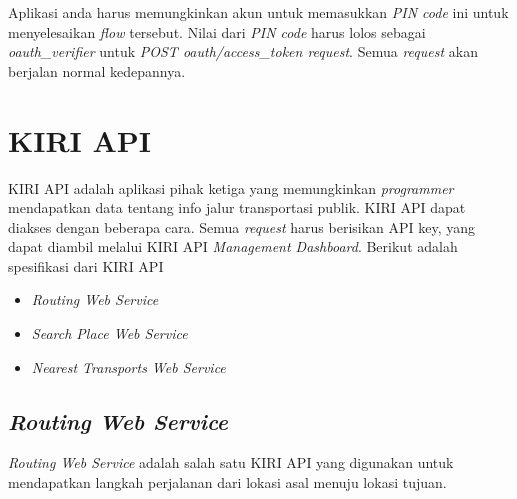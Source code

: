Aplikasi anda harus memungkinkan akun untuk memasukkan \textit{PIN code} ini untuk menyelesaikan \textit{flow} tersebut. Nilai dari \textit{PIN code} harus lolos sebagai \textit{oauth\_verifier} untuk \textit{POST oauth/access\_token request}. Semua \textit{request} akan berjalan normal kedepannya.




\section{KIRI API}
KIRI API adalah aplikasi pihak ketiga yang memungkinkan \textit{programmer} mendapatkan data tentang info jalur transportasi publik. KIRI API dapat diakses dengan beberapa cara. Semua \textit{request} harus berisikan API key, yang dapat diambil melalui KIRI API \textit{Management Dashboard}. Berikut adalah spesifikasi dari KIRI API

\begin{itemize}
	\item \textit{Routing Web Service}
	\item \textit{Search Place Web Service}
	\item \textit{Nearest Transports Web Service}
\end{itemize}

\subsection{\textit{Routing Web Service}}
\textit{Routing Web Service} adalah salah satu KIRI API yang digunakan untuk mendapatkan langkah perjalanan dari lokasi asal menuju lokasi tujuan.

